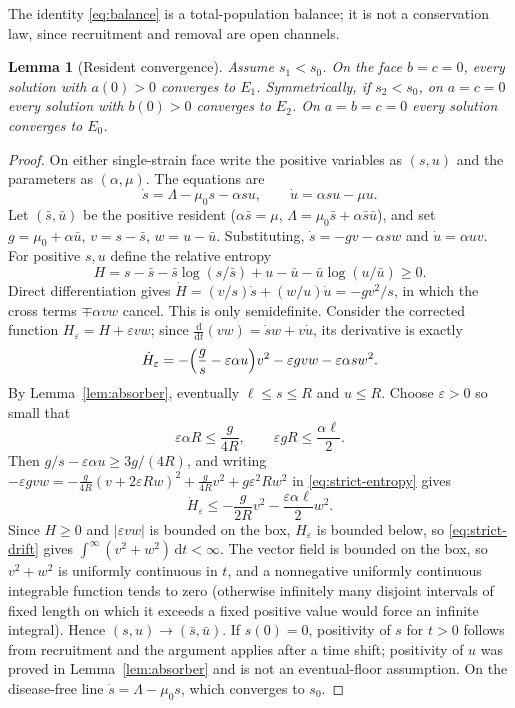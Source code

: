 \documentclass[11pt,a4paper]{article}
\theoremstyle{plain}
\newtheorem{lemma}[theorem]{Lemma}
\theoremstyle{definition}
\theoremstyle{remark}
\newcommand{\dd}{\mathrm d}
\newcommand{\eps}{\varepsilon}
\begin{document}
The identity \eqref{eq:balance} is a total-population balance; it is not a conservation law, since recruitment and removal are open channels.

\begin{lemma}[Resident convergence]\label{lem:resident}
Assume $s_1<s_0$. On the face $b=c=0$, every solution with $a(0)>0$ converges to $E_1$. Symmetrically, if $s_2<s_0$, on $a=c=0$ every solution with $b(0)>0$ converges to $E_2$. On $a=b=c=0$ every solution converges to $E_0$.
\end{lemma}
\begin{proof}
On either single-strain face write the positive variables as $(s,u)$ and the parameters as $(\alpha,\mu)$. The equations are
\[
 \dot s=\Lambda-\mu_0s-\alpha su,\qquad \dot u=\alpha su-\mu u.
\]
Let $(\bar s,\bar u)$ be the positive resident ($\alpha\bar s=\mu$, $\Lambda=\mu_0\bar s+\alpha\bar s\bar u$), and set $g=\mu_0+\alpha\bar u$, $v=s-\bar s$, $w=u-\bar u$. Substituting, $\dot s=-gv-\alpha sw$ and $\dot u=\alpha uv$. For positive $s,u$ define the relative entropy
\[
 H=s-\bar s-\bar s\log(s/\bar s)+u-\bar u-\bar u\log(u/\bar u)\ge0.
\]
Direct differentiation gives $\dot H=(v/s)\dot s+(w/u)\dot u=-gv^2/s$, in which the cross terms $\mp\alpha vw$ cancel. This is only semidefinite. Consider the corrected function $H_\eps=H+\eps vw$; since $\frac{\dd}{\dd t}(vw)=\dot sw+v\dot u$, its derivative is exactly
\begin{equation}\label{eq:strict-entropy}
 \dot H_\eps=-\Bigl(\frac gs-\eps\alpha u\Bigr)v^2-\eps gvw-\eps\alpha sw^2.
\end{equation}
By Lemma~\ref{lem:absorber}, eventually $\ell\le s\le R$ and $u\le R$. Choose $\eps>0$ so small that
\[
 \eps\alpha R\le\frac{g}{4R},\qquad \eps gR\le\frac{\alpha\ell}{2}.
\]
Then $g/s-\eps\alpha u\ge3g/(4R)$, and writing $-\eps gvw=-\frac{g}{4R}(v+2\eps Rw)^2+\frac{g}{4R}v^2+g\eps^2Rw^2$ in \eqref{eq:strict-entropy} gives
\begin{equation}\label{eq:strict-drift}
 \dot H_\eps\le-\frac{g}{2R}v^2-\frac{\eps\alpha\ell}{2}w^2 .
\end{equation}
Since $H\ge0$ and $|\eps vw|$ is bounded on the box, $H_\eps$ is bounded below, so \eqref{eq:strict-drift} gives $\int^\infty(v^2+w^2)\,\dd t<\infty$. The vector field is bounded on the box, so $v^2+w^2$ is uniformly continuous in $t$, and a nonnegative uniformly continuous integrable function tends to zero (otherwise infinitely many disjoint intervals of fixed length on which it exceeds a fixed positive value would force an infinite integral). Hence $(s,u)\to(\bar s,\bar u)$. If $s(0)=0$, positivity of $s$ for $t>0$ follows from recruitment and the argument applies after a time shift; positivity of $u$ was proved in Lemma~\ref{lem:absorber} and is not an eventual-floor assumption. On the disease-free line $\dot s=\Lambda-\mu_0s$, which converges to $s_0$.
\end{proof}
\end{document}
